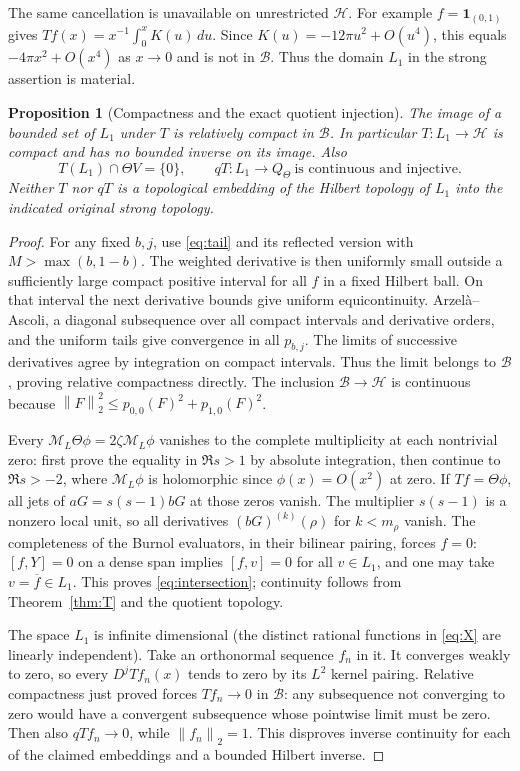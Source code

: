 \documentclass[11pt]{article}
\newtheorem{proposition}[theorem]{Proposition}
\newcommand{\B}{\mathscr B}\newcommand{\HH}{\mathcal H}
\newcommand{\ML}{\mathcal M_{\!L}}\newcommand{\MR}{\mathcal M_{\!R}}
\newcommand{\norm}[1]{\left\lVert#1\right\rVert}
\begin{document}
The same cancellation is unavailable on unrestricted $\HH$.
For example $f=\mathbf1_{(0,1)}$ gives
$Tf(x)=x^{-1}\int_0^xK(u)\,du$. Since
$K(u)=-12\pi u^2+O(u^4)$, this equals
$-4\pi x^2+O(x^4)$ as $x\to0$ and is not in $\B$.
Thus the domain $L_1$ in the strong assertion is material.

\begin{proposition}[Compactness and the exact quotient injection]
\label{prop:quotient}
The image of a bounded set of $L_1$ under $T$ is relatively
compact in $\B$. In particular $T:L_1\to\HH$ is compact and
has no bounded inverse on its image. Also
\begin{equation}\label{eq:intersection}
 T(L_1)\cap\Theta V=\{0\},\qquad
 qT:L_1\longrightarrow Q_\Theta\ \text{is continuous and injective}.
\end{equation}
Neither $T$ nor $qT$ is a topological embedding of the Hilbert
topology of $L_1$ into the indicated original strong topology.
\end{proposition}
\begin{proof}
For any fixed $b,j$, use \eqref{eq:tail} and its reflected version
with $M>\max(b,1-b)$. The weighted derivative is then uniformly
small outside a sufficiently large compact positive interval for
all $f$ in a fixed Hilbert ball. On that interval the next
derivative bounds give uniform equicontinuity. Arzel\`a--Ascoli,
a diagonal subsequence over all compact intervals and derivative
orders, and the uniform tails give convergence in all $p_{b,j}$.
The limits of successive derivatives agree by integration on
compact intervals. Thus the limit belongs to $\B$, proving
relative compactness directly. The inclusion $\B\to\HH$ is
continuous because
$\norm F_2^2\leq p_{0,0}(F)^2+p_{1,0}(F)^2$.

Every $\ML\Theta\phi=2\zeta\ML\phi$ vanishes to the complete
multiplicity at each nontrivial zero: first prove the equality in
$\Re s>1$ by absolute integration, then continue to $\Re s>-2$,
where $\ML\phi$ is holomorphic since $\phi(x)=O(x^2)$ at zero.
If $Tf=\Theta\phi$, all jets of $aG=s(s-1)bG$ at those zeros
vanish. The multiplier $s(s-1)$ is a nonzero local unit, so all
derivatives $(bG)^{(k)}(\rho)$ for $k<m_\rho$ vanish. The
completeness of the Burnol evaluators, in their bilinear pairing,
forces $f=0$: $[f,Y]=0$ on a dense span implies $[f,v]=0$ for
all $v\in L_1$, and one may take $v=\overline f\in L_1$.
This proves \eqref{eq:intersection}; continuity follows from
Theorem~\ref{thm:T} and the quotient topology.

The space $L_1$ is infinite dimensional (the distinct rational
functions in \eqref{eq:X} are linearly independent). Take an
orthonormal sequence $f_n$ in it. It converges weakly to zero, so
every $D^jTf_n(x)$ tends to zero by its $L^2$ kernel pairing.
Relative compactness just proved forces $Tf_n\to0$ in $\B$:
any subsequence not converging to zero would have a convergent
subsequence whose pointwise limit must be zero. Then also
$qTf_n\to0$, while $\norm{f_n}_2=1$. This disproves inverse
continuity for each of the claimed embeddings and a bounded
Hilbert inverse.
\end{proof}
\end{document}
